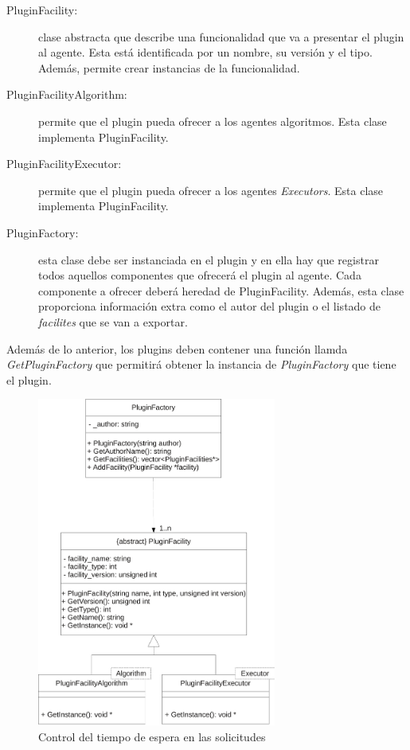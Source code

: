 \begin{description}
	\item[PluginFacility:] clase abstracta que describe una funcionalidad que va a presentar el plugin al agente. Esta está identificada por un nombre, su versión y el tipo. Además, permite crear instancias de la funcionalidad.
	
	\item[PluginFacilityAlgorithm:] permite que el plugin pueda ofrecer a los agentes algoritmos. Esta clase implementa PluginFacility.
	
	\item[PluginFacilityExecutor:] permite que el plugin pueda ofrecer a los agentes \emph{Executors}. Esta clase implementa PluginFacility.
	
	\item[PluginFactory:] esta clase debe ser instanciada en el plugin y en ella hay que registrar todos aquellos componentes que ofrecerá el plugin al agente. Cada componente a ofrecer deberá heredad de PluginFacility. Además, esta clase proporciona información extra como el autor del plugin o el listado de \emph{facilites} que se van a exportar.
\end{description}

Además de lo anterior, los plugins deben contener una función llamda \emph{GetPluginFactory} que permitirá obtener la instancia de \emph{PluginFactory} que tiene el plugin.

\begin{figure}
	\centering
	\includegraphics[width=0.7\textwidth]{images/plugins.pdf}
	\caption{Control del tiempo de espera en las solicitudes}\label{fig:plugins}
\end{figure}

